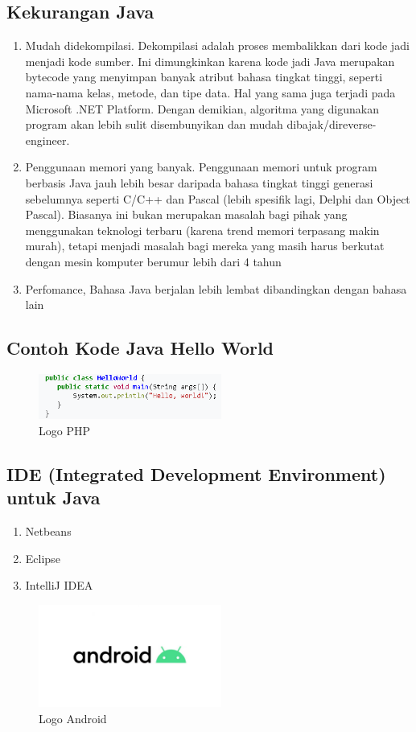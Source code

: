 \subsection{Kekurangan Java}
\begin{enumerate}
	\item Mudah didekompilasi. Dekompilasi adalah proses membalikkan dari kode jadi menjadi kode sumber. Ini dimungkinkan karena kode jadi Java merupakan bytecode yang menyimpan banyak atribut bahasa tingkat tinggi, seperti nama-nama kelas, metode, dan tipe data. Hal yang sama juga terjadi pada Microsoft .NET Platform. Dengan demikian, algoritma yang digunakan program akan lebih sulit disembunyikan dan mudah dibajak/direverse-engineer.
	\item Penggunaan memori yang banyak. Penggunaan memori untuk program berbasis Java jauh lebih besar daripada bahasa tingkat tinggi generasi sebelumnya seperti C/C++ dan Pascal (lebih spesifik lagi, Delphi dan Object Pascal). Biasanya ini bukan merupakan masalah bagi pihak yang menggunakan teknologi terbaru (karena trend memori terpasang makin murah), tetapi menjadi masalah bagi mereka yang masih harus berkutat dengan mesin komputer berumur lebih dari 4 tahun
	\item Perfomance, Bahasa Java berjalan lebih lembat dibandingkan dengan bahasa lain
\end{enumerate}

\subsection{Contoh Kode Java Hello World}
	\begin{figure}[H]
		\includegraphics[width=6cm]{figures/web/contohjava.png}
		\centering
		\caption{Logo PHP}
	\end{figure}

\subsection{IDE (Integrated Development Environment) untuk Java}

\begin{enumerate}
	\item Netbeans
	\item Eclipse
	\item IntelliJ IDEA
\end{enumerate}
	\begin{figure}[H]
		\includegraphics[width=6cm]{figures/android.jpg}
		\centering
		\caption{Logo Android}
	\end{figure}
